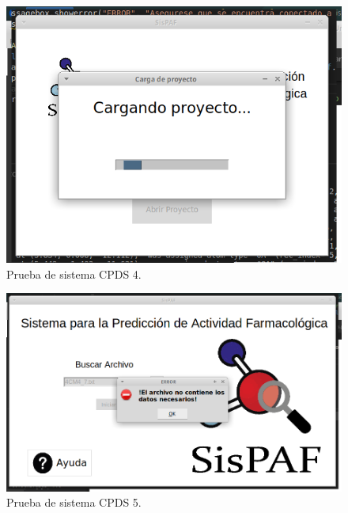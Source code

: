 \begin{figure}[H]
    \centering
    \includegraphics[scale=0.60]{Capitulo4/Documentos/Casos_de_sistema/imagenes_casos/Charge.png}
    \caption{Prueba de sistema CPDS 4.}
    \label{Evidencia10}
\end{figure}

\begin{figure}[H]
    \centering
    \includegraphics[scale=0.60]{Capitulo4/Documentos/Casos_de_sistema/imagenes_casos/Failfile.png}
    \caption{Prueba de sistema CPDS 5.}
    \label{Evidencia10}
\end{figure}

